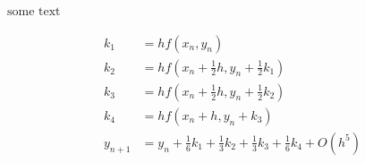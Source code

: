 \documentclass[12pt]{article}
\begin{document}
$\textrm{some\ text}$ %


\begin{align*}
k_1 &= hf(x_n,y_n)\\
k_2 &= hf(x_n+\frac{1}{2}h,y_n+\frac{1}{2}k_1)\\
k_3 &= hf(x_n+\frac{1}{2}h,y_n+\frac{1}{2}k_2)\\
k_4 &= hf(x_n+h,y_n+k_3)\\
y_{n+1} &=
y_n+\frac{1}{6}k_1+\frac{1}{3}k_2+\frac{1}{3}k_3+\frac{1}{6}k_4+O(h^5)\\
\end{align*}

\end{document}

